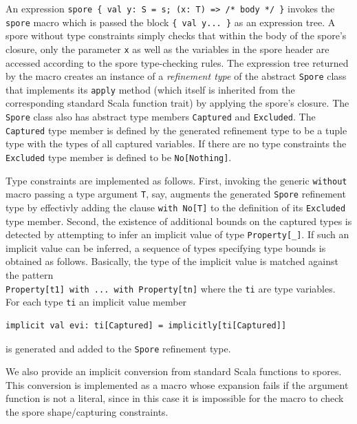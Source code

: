 \documentclass{llncs}
\begin{document}
An expression \verb|spore { val y: S = s; (x: T) => /* body */ }| invokes the \verb|spore| macro which is passed the block \verb|{ val y... }| as an expression tree. A spore without type constraints simply checks that within the body of the spore's closure, only the parameter \verb|x| as well as the variables in the spore header are accessed according to the spore type-checking rules. The expression tree returned by the macro creates an instance of a {\em refinement type} of the abstract \verb|Spore| class that implements its \verb|apply| method (which itself is inherited from the corresponding standard Scala function trait) by applying the spore's closure. The \verb|Spore| class also has abstract type members \verb|Captured| and \verb|Excluded|. The \verb|Captured| type member is defined by the generated refinement type to be a tuple type with the types of all captured variables. If there are no type constraints the \verb|Excluded| type member is defined to be \verb|No[Nothing]|.

Type constraints are implemented as follows. First, invoking the generic \verb|without| macro passing a type argument \verb|T|, say, augments the generated \verb|Spore| refinement type by effectivly adding the clause \verb|with No[T]| to the definition of its \verb|Excluded| type member. Second, the existence of additional bounds on the captured types is detected by attempting to infer an implicit value of type \verb|Property[_]|. If such an implicit value can be inferred, a sequence of types specifying type bounds is obtained as follows. Basically, the type of the implicit value is matched against the pattern \\ \verb|Property[t1] with ... with Property[tn]| where the \verb|ti| are type variables. For each type \verb|ti| an implicit value member

\begin{lstlisting}[numbers=none]
    implicit val evi: ti[Captured] = implicitly[ti[Captured]]
\end{lstlisting}
\noindent
is generated and added to the \verb|Spore| refinement type.

We also provide an implicit conversion from standard Scala functions to spores. This conversion is implemented as a macro whose expansion fails if the argument function is not a literal, since in this case it is impossible for the macro to check the spore shape/capturing constraints.

\end{document}
